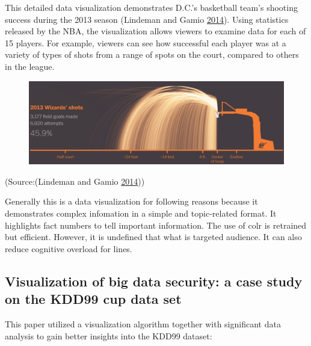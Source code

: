 \documentclass[]{book}
\theoremstyle{definition}
\theoremstyle{definition}
\theoremstyle{definition}
\theoremstyle{remark}
\begin{document}
This detailed data visualization demonstrates D.C.'s basketball team's
shooting success during the 2013 season (Lindeman and Gamio
\protect\hyperlink{ref-basketball}{2014}). Using statistics released by
the NBA, the visualization allows viewers to examine data for each of 15
players. For example, viewers can see how successful each player was at
a variety of types of shots from a range of spots on the court, compared
to others in the league.

\begin{figure}
\centering
\includegraphics{images/wizards_shooting.png}
\caption{}
\end{figure}

(Source:(Lindeman and Gamio \protect\hyperlink{ref-basketball}{2014}))

Generally this is a data visualization for following reasons because it
demonstrates complex infomation in a simple and topic-related format. It
highlights fact numbers to tell important information. The use of colr
is retrained but efficient. However, it is undefined that what is
targeted audience. It can also reduce cognitive overload for lines.

\subsection{Visualization of big data security: a case study on the
KDD99 cup data
set}\label{visualization-of-big-data-security-a-case-study-on-the-kdd99-cup-data-set}

This paper utilized a visualization algorithm together with significant
data analysis to gain better insights into the KDD99 dataset:
\end{document}
